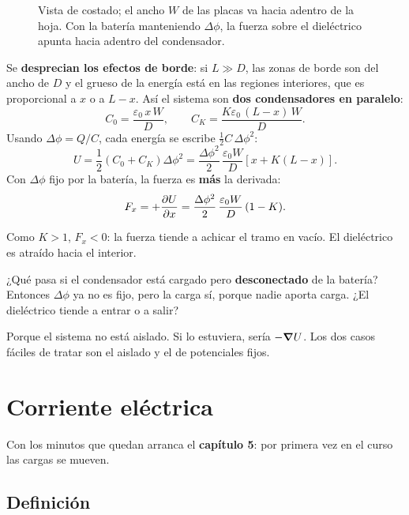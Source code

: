 \documentclass[12pt,a4paper]{article}
\begin{document}
\begin{figure}[H]
  \centering
  
  \caption{Vista de costado; el ancho $W$ de las placas va hacia adentro de la
  hoja. Con la batería manteniendo $\Delta\phi$, la fuerza sobre el dieléctrico
  apunta hacia adentro del condensador.}
\end{figure}

Se \textbf{desprecian los efectos de borde}: si $L\gg D$, las zonas de borde son
del ancho de $D$ y el grueso de la energía está en las regiones interiores, que
es proporcional a $x$ o a $L-x$. Así el sistema son \textbf{dos condensadores en
paralelo}:
\[
C_0 = \frac{\varepsilon_0\, x\,W}{D},
\qquad
C_K = \frac{K\varepsilon_0\,(L-x)\,W}{D}.
\]
Usando $\Delta\phi = Q/C$, cada energía se escribe $\tfrac12 C\,\Delta\phi^2$:
\[
U = \frac12\left(C_0 + C_K\right)\Delta\phi^2
= \frac{\Delta\phi^2}{2}\,\frac{\varepsilon_0 W}{D}\left[x + K(L-x)\right].
\]
Con $\Delta\phi$ fijo por la batería, la fuerza es \textbf{más} la derivada:
\[
F_x = +\pdv{U}{x} = \frac{\Delta\phi^2}{2}\,\frac{\varepsilon_0 W}{D}\,(1-K) .
\]

\begin{keybox}
Como $K>1$, $F_x<0$: la fuerza tiende a achicar el tramo en vacío. El dieléctrico
es atraído hacia el interior.
\end{keybox}

\begin{notebox}[Ejercicio]
¿Qué pasa si el condensador está cargado pero \textbf{desconectado} de la
batería? Entonces $\Delta\phi$ ya no es fijo, pero la carga sí, porque nadie
aporta carga. ¿El dieléctrico tiende a entrar o a salir?
\end{notebox}

\begin{warnbox}
Porque el sistema no está aislado. Si lo estuviera, sería $-\grad U$. Los dos
casos fáciles de tratar son el aislado y el de potenciales fijos.
\end{warnbox}

\section{Corriente eléctrica}

Con los minutos que quedan arranca el \textbf{capítulo 5}: por primera vez en el
curso las cargas se mueven.

\subsection{Definición}
\end{document}
